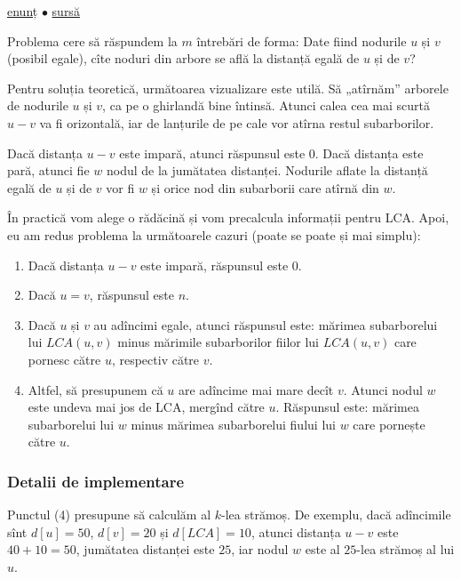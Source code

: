 \documentclass[../main.tex]{subfiles}
\begin{document}
\href{https://codeforces.com/contest/519/problem/E}{enunț}
$\bullet$
\hyperref[code:a-and-b-and-lecture-rooms]{sursă}

Problema cere să răspundem la $m$ întrebări de forma: Date fiind nodurile $u$ și $v$ (posibil egale), cîte noduri din arbore se află la distanță egală de $u$ și de $v$?

Pentru soluția teoretică, următoarea vizualizare este utilă. Să „atîrnăm” arborele de nodurile $u$ și $v$, ca pe o ghirlandă bine întinsă.  Atunci calea cea mai scurtă $u-v$ va fi orizontală, iar de lanțurile de pe cale vor atîrna restul subarborilor.

Dacă distanța $u-v$ este impară, atunci răspunsul este 0. Dacă distanța este pară, atunci fie $w$ nodul de la jumătatea distanței. Nodurile aflate la distanță egală de $u$ și de $v$ vor fi $w$ și orice nod din subarborii care atîrnă din $w$.

În practică vom alege o rădăcină și vom precalcula informații pentru LCA. Apoi, eu am redus problema la următoarele cazuri (poate se poate și mai simplu):

\begin{enumerate}
  \item Dacă distanța $u-v$ este impară, răspunsul este 0.

  \item Dacă $u=v$, răspunsul este $n$.

  \item Dacă $u$ și $v$ au adîncimi egale, atunci răspunsul este: mărimea subarborelui lui $LCA(u,v)$ minus mărimile subarborilor fiilor lui $LCA(u,v)$ care pornesc către $u$, respectiv către $v$.

  \item Altfel, să presupunem că $u$ are adîncime mai mare decît $v$. Atunci nodul $w$ este undeva mai jos de LCA, mergînd către $u$. Răspunsul este: mărimea subarborelui lui $w$ minus mărimea subarborelui fiului lui $w$ care pornește către $u$.
\end{enumerate}

\subsubsection*{Detalii de implementare}

Punctul (4) presupune să calculăm al $k$-lea strămoș. De exemplu, dacă adîncimile sînt $d[u]=50$, $d[v]=20$ și $d[LCA]=10$, atunci distanța $u-v$ este $40+10=50$, jumătatea distanței este $25$, iar nodul $w$ este al $25$-lea strămoș al lui $u$.
\end{document}
